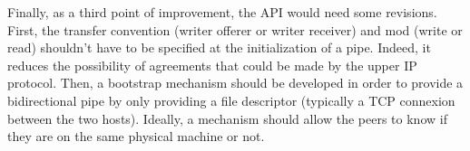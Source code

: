 \documentclass[journal]{IEEEtran}
\begin{document}
Finally, as a third point of improvement, the API would need some revisions. First, the transfer convention (writer offerer or writer receiver) and mod (write or read) shouldn't have to be specified at the initialization of a pipe. Indeed, it reduces the possibility of agreements that could be made by the upper IP protocol. Then, a bootstrap mechanism should be developed in order to provide a bidirectional pipe by only providing a file descriptor (typically a TCP connexion between the two hosts). Ideally, a mechanism should allow the peers to know if they are on the same physical machine or not.



 

%









%
%
\end{document}

